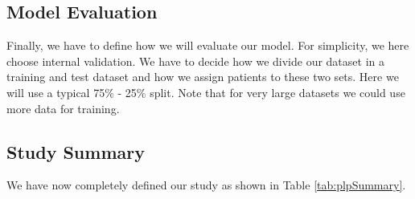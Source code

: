 \documentclass[11pt]{book}
\theoremstyle{definition}
\theoremstyle{definition}
\theoremstyle{definition}
\theoremstyle{remark}
\begin{document}
\subsection{Model Evaluation}\label{model-evaluation}

Finally, we have to define how we will evaluate our model. For
simplicity, we here choose internal validation. We have to decide how we
divide our dataset in a training and test dataset and how we assign
patients to these two sets. Here we will use a typical 75\% - 25\%
split. Note that for very large datasets we could use more data for
training.

\subsection{Study Summary}\label{study-summary-1}

We have now completely defined our study as shown in Table
\ref{tab:plpSummary}.
\end{document}

